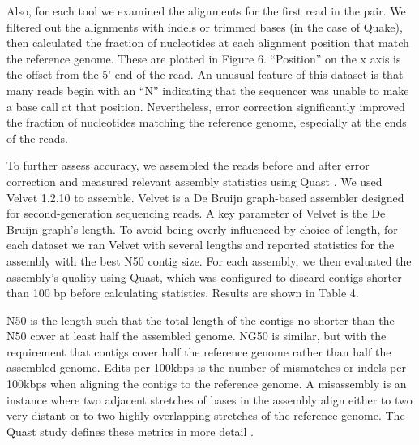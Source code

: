 \documentclass{bmcart}
\begin{document}


Also, for each tool we examined the alignments for the first read in the pair.  We filtered out the alignments with indels or trimmed bases (in the case of Quake), then calculated the fraction of nucleotides at each alignment position that match the reference genome.  These are plotted in Figure 6. ``Position'' on the x axis is the offset from the 5' end of the read.  An unusual feature of this dataset is that many reads begin with an ``N'' indicating that the sequencer was unable to make a base call at that position. Nevertheless, error correction significantly improved the fraction of nucleotides matching the reference genome, especially at the ends of the reads.



To further assess accuracy, we assembled the reads before and after error correction and measured relevant assembly statistics using Quast \cite{gurevich2013quast}.  We used Velvet 1.2.10\cite{zerbino2008velvet} to assemble.  Velvet is a De Bruijn graph-based assembler designed for second-generation sequencing reads.  A key parameter of Velvet is the De Bruijn graph's \kmer length.  To avoid being overly influenced by choice of \kmer length, for each dataset we ran Velvet with several \kmer lengths and reported statistics for the assembly with the best N50 contig size.  For each assembly, we then evaluated the assembly's quality using Quast, which was configured to discard contigs shorter than 100 bp before calculating statistics. Results are shown in Table 4.


N50 is the length such that the total length of the contigs no shorter than the N50 cover at least half the assembled genome.  NG50 is similar, but with the requirement that contigs cover half the reference genome rather than half the assembled genome. Edits per 100kbps is the number of mismatches or indels per 100kbps when aligning the contigs to the reference genome. A misassembly is an instance where two adjacent stretches of bases in the assembly align either to two very distant or to two highly overlapping stretches of the reference genome.  The Quast study defines these metrics in more detail \cite{gurevich2013quast}.
\end{document}
